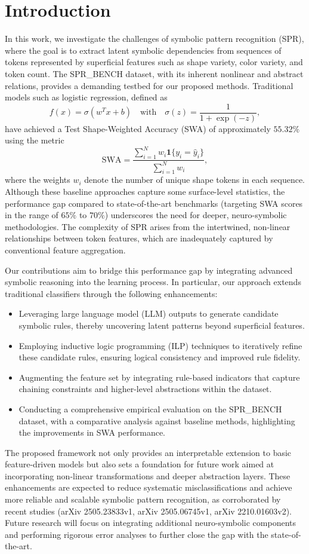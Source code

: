 \documentclass{article}
\begin{document}
\section{Introduction}
In this work, we investigate the challenges of symbolic pattern recognition (SPR), where the goal is to extract latent symbolic dependencies from sequences of tokens represented by superficial features such as shape variety, color variety, and token count. The SPR\_BENCH dataset, with its inherent nonlinear and abstract relations, provides a demanding testbed for our proposed methods. Traditional models such as logistic regression, defined as 
\[
f(x) = \sigma(w^T x + b) \quad \text{with} \quad \sigma(z) = \frac{1}{1+\exp(-z)},
\]
have achieved a Test Shape-Weighted Accuracy (SWA) of approximately \(55.32\%\) using the metric 
\[
\text{SWA} = \frac{\sum_{i=1}^N w_i \mathbf{1}\{y_i=\hat{y}_i\}}{\sum_{i=1}^N w_i},
\]
where the weights \(w_i\) denote the number of unique shape tokens in each sequence. Although these baseline approaches capture some surface-level statistics, the performance gap compared to state-of-the-art benchmarks (targeting SWA scores in the range of \(65\%\) to \(70\%\)) underscores the need for deeper, neuro-symbolic methodologies. The complexity of SPR arises from the intertwined, non-linear relationships between token features, which are inadequately captured by conventional feature aggregation.

Our contributions aim to bridge this performance gap by integrating advanced symbolic reasoning into the learning process. In particular, our approach extends traditional classifiers through the following enhancements:
\begin{itemize}
    \item Leveraging large language model (LLM) outputs to generate candidate symbolic rules, thereby uncovering latent patterns beyond superficial features.
    \item Employing inductive logic programming (ILP) techniques to iteratively refine these candidate rules, ensuring logical consistency and improved rule fidelity.
    \item Augmenting the feature set by integrating rule-based indicators that capture chaining constraints and higher-level abstractions within the dataset.
    \item Conducting a comprehensive empirical evaluation on the SPR\_BENCH dataset, with a comparative analysis against baseline methods, highlighting the improvements in SWA performance.
\end{itemize}
The proposed framework not only provides an interpretable extension to basic feature-driven models but also sets a foundation for future work aimed at incorporating non-linear transformations and deeper abstraction layers. These enhancements are expected to reduce systematic misclassifications and achieve more reliable and scalable symbolic pattern recognition, as corroborated by recent studies (arXiv 2505.23833v1, arXiv 2505.06745v1, arXiv 2210.01603v2). Future research will focus on integrating additional neuro-symbolic components and performing rigorous error analyses to further close the gap with the state-of-the-art.
\end{document}
